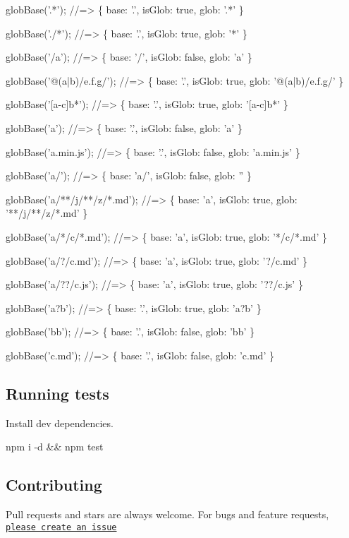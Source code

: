 \begin{DoxyCode}
globBase('.*');
//=> \{ base: '.', isGlob: true, glob: '.*' \}

globBase('./*');
//=> \{ base: '.', isGlob: true, glob: '*' \}

globBase('/a');
//=> \{ base: '/', isGlob: false, glob: 'a' \}

globBase('@(a|b)/e.f.g/');
//=> \{ base: '.', isGlob: true, glob: '@(a|b)/e.f.g/' \}

globBase('[a-c]b*');
//=> \{ base: '.', isGlob: true, glob: '[a-c]b*' \}

globBase('a');
//=> \{ base: '.', isGlob: false, glob: 'a' \}

globBase('a.min.js');
//=> \{ base: '.', isGlob: false, glob: 'a.min.js' \}

globBase('a/');
//=> \{ base: 'a/', isGlob: false, glob: '' \}

globBase('a/**/j/**/z/*.md');
//=> \{ base: 'a', isGlob: true, glob: '**/j/**/z/*.md' \}

globBase('a/*/c/*.md');
//=> \{ base: 'a', isGlob: true, glob: '*/c/*.md' \}

globBase('a/?/c.md');
//=> \{ base: 'a', isGlob: true, glob: '?/c.md' \}

globBase('a/??/c.js');
//=> \{ base: 'a', isGlob: true, glob: '??/c.js' \}

globBase('a?b');
//=> \{ base: '.', isGlob: true, glob: 'a?b' \}

globBase('bb');
//=> \{ base: '.', isGlob: false, glob: 'bb' \}

globBase('c.md');
//=> \{ base: '.', isGlob: false, glob: 'c.md' \}
\end{DoxyCode}


\subsection*{Running tests}

Install dev dependencies.


\begin{DoxyCode}
npm i -d && npm test
\end{DoxyCode}


\subsection*{Contributing}

Pull requests and stars are always welcome. For bugs and feature requests, \href{https://github.com/jonschlinkert/glob-base/issues}{\tt please create an issue}


